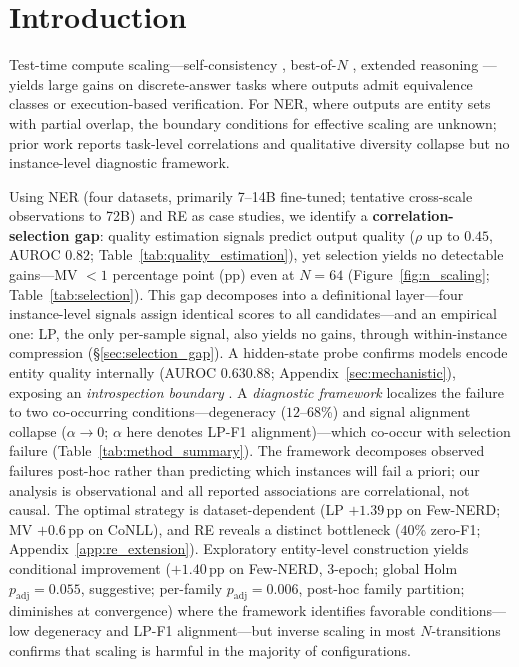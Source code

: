 \section{Introduction}\label{sec:introduction}

Test-time compute scaling---self-consistency \cite{wang2023selfconsistency}, best-of-$N$ \cite{snell2025scaling, brown2024monkeys}, extended reasoning \cite{muennighoff2025s1}---yields large gains on discrete-answer tasks where outputs admit equivalence classes or execution-based verification.
For NER, where outputs are entity sets with partial overlap, the boundary conditions for effective scaling are unknown; prior work reports task-level correlations \cite{yao2026consistency} and qualitative diversity collapse \cite{yun2025price} but no instance-level diagnostic framework.

Using NER (four datasets, primarily 7--14B fine-tuned; tentative cross-scale observations to 72B) and RE as case studies, we identify a \textbf{correlation-selection gap}: quality estimation signals predict output quality ($\rho$ up to $0.45$, AUROC $0.82$; Table~\ref{tab:quality_estimation}), yet selection yields no detectable gains---MV ${<}1$ percentage point (pp) even at $N{=}64$ (Figure~\ref{fig:n_scaling}; Table~\ref{tab:selection}).
This gap decomposes into a definitional layer---four instance-level signals assign identical scores to all candidates---and an empirical one: LP, the only per-sample signal, also yields no gains, through within-instance compression (\S\ref{sec:selection_gap}).
A hidden-state probe confirms models encode entity quality internally (AUROC $0.63$\textendash$0.88$; Appendix~\ref{sec:mechanistic}), exposing an \textit{introspection boundary} \cite{huang2024large}.
A \textit{diagnostic framework} localizes the failure to two co-occurring conditions---degeneracy ($12$--$68$\%) and signal alignment collapse ($\alpha{\to}0$; $\alpha$ here denotes LP-F1 alignment)---which co-occur with selection failure (Table~\ref{tab:method_summary}).
The framework decomposes observed failures post-hoc rather than predicting which instances will fail a priori; our analysis is observational and all reported associations are correlational, not causal.
The optimal strategy is dataset-dependent (LP $+1.39$\,pp on Few-NERD; MV $+0.6$\,pp on CoNLL), and RE reveals a distinct bottleneck ($40$\% zero-F1; Appendix~\ref{app:re_extension}).
Exploratory entity-level construction yields conditional improvement ($+1.40$\,pp on Few-NERD, 3-epoch; global Holm $p_{\text{adj}}{=}0.055$, suggestive; per-family $p_{\text{adj}}{=}0.006$, post-hoc family partition; diminishes at convergence) where the framework identifies favorable conditions---low degeneracy and LP-F1 alignment---but inverse scaling in most $N$-transitions confirms that scaling is harmful in the majority of configurations.

